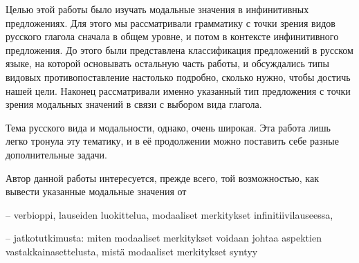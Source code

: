 \documentclass{article}
\begin{document}
Целью этой работы было изучать модальные значения в инфинитивных предложениях. Для этого мы рассматривали грамматику с точки зрения видов русского глагола сначала в общем уровне, и потом в контексте инфинитивного предложения. До этого были представлена классификация предложений в русском языке, на которой основывать остальную часть работы, и обсуждались типы видовых противопоставление настолько подробно, сколько нужно, чтобы достичь нашей цели. Наконец рассматривали именно указанный тип предложения с точки зрения модальных значений в связи с выбором вида глагола.

Тема русского вида и модальности, однако, очень широкая. Эта работа лишь легко тронула эту тематику, и в её продолжении можно поставить себе разные дополнительные задачи. 

Автор данной работы интересуется, прежде всего, той возможностью, как вывести указанные модальные значения от 

-- verbioppi, lauseiden luokittelua, modaaliset merkitykset infinitiivilauseessa,

-- jatkotutkimusta: miten modaaliset merkitykset voidaan johtaa aspektien vastakkainasettelusta, mistä modaaliset merkitykset syntyy




\printbibliography[heading=bibintoc,title={Список использоваемой литературы}]


%
%
\end{document}
